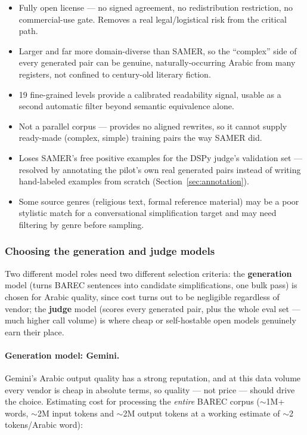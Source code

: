 \documentclass[11pt,a4paper]{article}
\newcommand{\proscons}[2]{%
  \begin{minipage}[t]{0.485\textwidth}
    \begin{prosbox}
      \begin{itemize}[leftmargin=1.1em,itemsep=1pt,topsep=1pt]
        #1
      \end{itemize}
    \end{prosbox}
  \end{minipage}\hfill
  \begin{minipage}[t]{0.485\textwidth}
    \begin{consbox}
      \begin{itemize}[leftmargin=1.1em,itemsep=1pt,topsep=1pt]
        #2
      \end{itemize}
    \end{consbox}
  \end{minipage}
}
\begin{document}
\proscons{
  \item Fully open license --- no signed agreement, no redistribution
  restriction, no commercial-use gate. Removes a real legal/logistical risk
  from the critical path.
  \item Larger and far more domain-diverse than SAMER, so the ``complex'' side
  of every generated pair can be genuine, naturally-occurring Arabic from many
  registers, not confined to century-old literary fiction.
  \item 19 fine-grained levels provide a calibrated readability signal, usable
  as a second automatic filter beyond semantic equivalence alone.
}{
  \item Not a parallel corpus --- provides no aligned rewrites, so it cannot
  supply ready-made (complex, simple) training pairs the way SAMER did.
  \item Loses SAMER's free positive examples for the DSPy judge's validation
  set --- resolved by annotating the pilot's own real generated pairs
  instead of writing hand-labeled examples from scratch
  (Section~\ref{sec:annotation}).
  \item Some source genres (religious text, formal reference material) may be
  a poor stylistic match for a conversational simplification target and may
  need filtering by genre before sampling.
}

\subsubsection{Choosing the generation and judge models}
\label{sec:model-choice}

Two different model roles need two different selection criteria: the
\textbf{generation} model (turns BAREC sentences into candidate simplifications,
one bulk pass) is chosen for Arabic quality, since cost turns out to be
negligible regardless of vendor; the \textbf{judge} model (scores every
generated pair, plus the whole eval set --- much higher call volume) is where
cheap or self-hostable open models genuinely earn their place.

\paragraph{Generation model: Gemini.} Gemini's Arabic output quality has a
strong reputation, and at this data volume every vendor is cheap in absolute
terms, so quality --- not price --- should drive the choice. Estimating cost
for processing the \emph{entire} BAREC corpus ($\sim$1M+ words, $\sim$2M input
tokens and $\sim$2M output tokens at a working estimate of $\sim$2
tokens/Arabic word):
\end{document}
